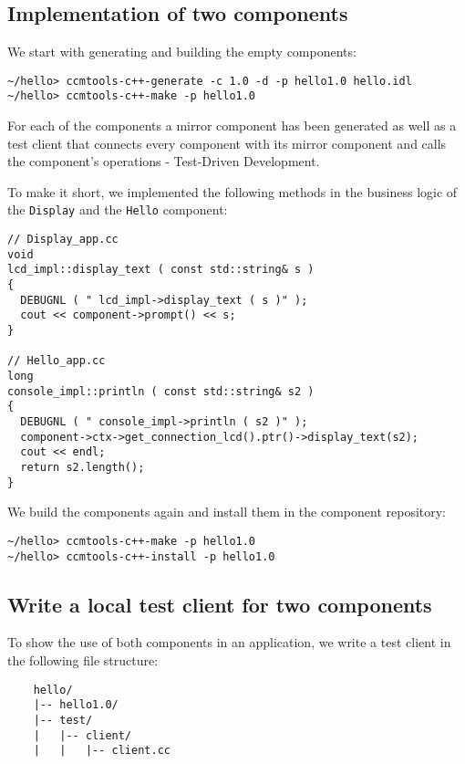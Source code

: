 \subsection{Implementation of two components}

We start with generating and building the empty components:
\begin{verbatim}
~/hello> ccmtools-c++-generate -c 1.0 -d -p hello1.0 hello.idl
~/hello> ccmtools-c++-make -p hello1.0
\end{verbatim}

\noindent
For each of the components a mirror component has been generated as well as a
test client that connects every component with its mirror component and calls 
the component's operations - Test-Driven Development.

To make it short, we implemented the following methods in the business logic
of the {\tt Display} and the {\tt Hello} component:
\begin{verbatim}
// Display_app.cc
void
lcd_impl::display_text ( const std::string& s )
{
  DEBUGNL ( " lcd_impl->display_text ( s )" );
  cout << component->prompt() << s;
}

// Hello_app.cc
long
console_impl::println ( const std::string& s2 )
{
  DEBUGNL ( " console_impl->println ( s2 )" );
  component->ctx->get_connection_lcd().ptr()->display_text(s2);
  cout << endl;
  return s2.length();	
}
\end{verbatim}

\noindent
We build the components again and install them in the component repository:
\begin{verbatim}
~/hello> ccmtools-c++-make -p hello1.0
~/hello> ccmtools-c++-install -p hello1.0
\end{verbatim}


\subsection{Write a local test client for two components}
To show the use of both components in an application, we write a test client in the
following file structure:
\begin{verbatim}
    hello/
    |-- hello1.0/
    |-- test/
    |   |-- client/
    |   |   |-- client.cc 
\end{verbatim}

